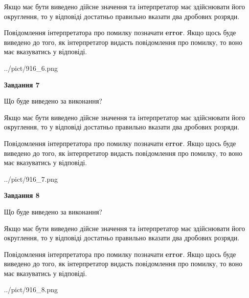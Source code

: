 \documentclass[12pt, ukrainian]{article}
\begin{document}
{\begin {Large}
Якщо має бути виведено дійсне значення та інтерпретатор має здійснювати його округлення, 
то у відповіді достатньо правильно вказати два дробових розряди.

Повідомлення інтерпретатора про помилку позначати \textbf{error}.
Якщо щось буде виведено до того, як інтерпретатор видасть повідомлення про помилку, 
то воно має вказуватись у відповіді. \par

\begin{center}
	{../pict/916_6.png}
\end{center}
\newpage

{\begin {center}\textbf{Завдання 7}\end {center}}\par
Що буде виведено за виконання? \par

Якщо має бути виведено дійсне значення та інтерпретатор має здійснювати його округлення, 
то у відповіді достатньо правильно вказати два дробових розряди.

Повідомлення інтерпретатора про помилку позначати \textbf{error}.
Якщо щось буде виведено до того, як інтерпретатор видасть повідомлення про помилку, 
то воно має вказуватись у відповіді. \par

\begin{center}
	{../pict/916_7.png}
\end{center}
\newpage

{\begin {center}\textbf{Завдання 8}\end {center}}\par
Що буде виведено за виконання? \par

Якщо має бути виведено дійсне значення та інтерпретатор має здійснювати його округлення, 
то у відповіді достатньо правильно вказати два дробових розряди.

Повідомлення інтерпретатора про помилку позначати \textbf{error}.
Якщо щось буде виведено до того, як інтерпретатор видасть повідомлення про помилку, 
то воно має вказуватись у відповіді. \par

\begin{center}
	{../pict/916_8.png}
\end{center}
\newpage


\end{Large}}
\end{document}
